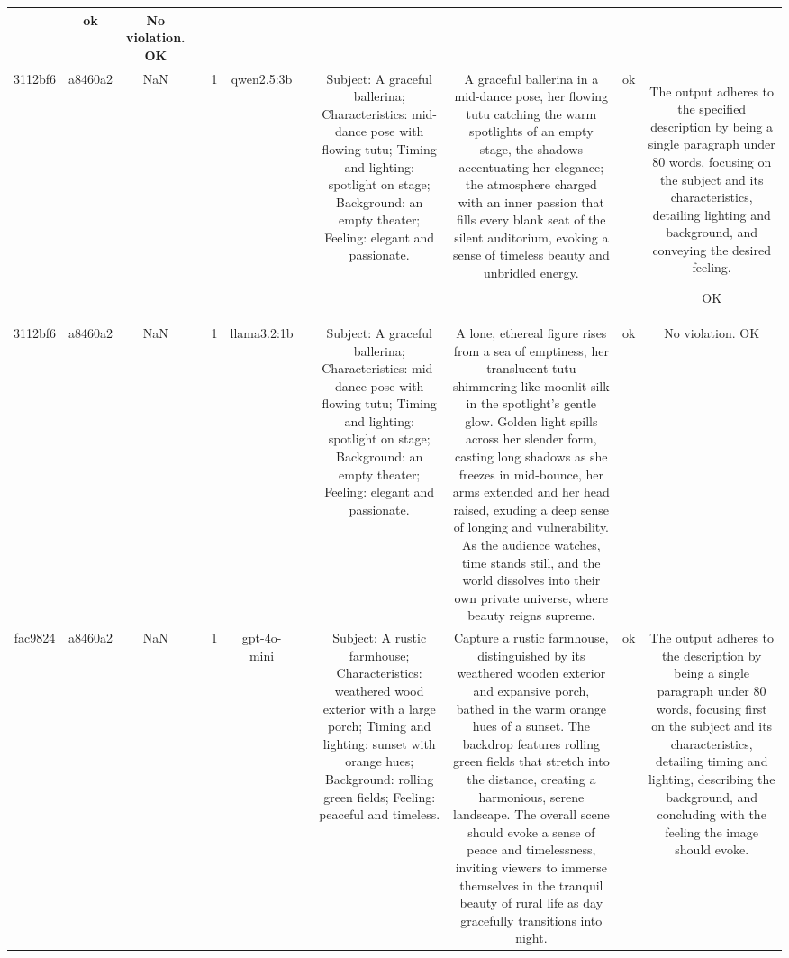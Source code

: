 \begin{table}[h!]
\begin{tabular}{|c|c|c|c|c|c|c|c|c|c|c|}
 & ok & No violation.
OK\\
\hline
3112bf6 & a8460a2 & NaN &  & 1 & qwen2.5:3b &  & Subject: A graceful ballerina; Characteristics: mid-dance pose with flowing tutu; Timing and lighting: spotlight on stage; Background: an empty theater; Feeling: elegant and passionate. & A graceful ballerina in a mid-dance pose, her flowing tutu catching the warm spotlights of an empty stage, the shadows accentuating her elegance; the atmosphere charged with an inner passion that fills every blank seat of the silent auditorium, evoking a sense of timeless beauty and unbridled energy. & ok & The output adheres to the specified description by being a single paragraph under 80 words, focusing on the subject and its characteristics, detailing lighting and background, and conveying the desired feeling.

OK\\
\hline
3112bf6 & a8460a2 & NaN &  & 1 & llama3.2:1b &  & Subject: A graceful ballerina; Characteristics: mid-dance pose with flowing tutu; Timing and lighting: spotlight on stage; Background: an empty theater; Feeling: elegant and passionate. & A lone, ethereal figure rises from a sea of emptiness, her translucent tutu shimmering like moonlit silk in the spotlight's gentle glow. Golden light spills across her slender form, casting long shadows as she freezes in mid-bounce, her arms extended and her head raised, exuding a deep sense of longing and vulnerability. As the audience watches, time stands still, and the world dissolves into their own private universe, where beauty reigns supreme. & ok & No violation.
OK\\
\hline
fac9824 & a8460a2 & NaN &  & 1 & gpt-4o-mini &  & Subject: A rustic farmhouse; Characteristics: weathered wood exterior with a large porch; Timing and lighting: sunset with orange hues; Background: rolling green fields; Feeling: peaceful and timeless. & Capture a rustic farmhouse, distinguished by its weathered wooden exterior and expansive porch, bathed in the warm orange hues of a sunset. The backdrop features rolling green fields that stretch into the distance, creating a harmonious, serene landscape. The overall scene should evoke a sense of peace and timelessness, inviting viewers to immerse themselves in the tranquil beauty of rural life as day gracefully transitions into night. & ok & The output adheres to the description by being a single paragraph under 80 words, focusing first on the subject and its characteristics, detailing timing and lighting, describing the background, and concluding with the feeling the image should evoke.


\end{tabular}
\end{table}
